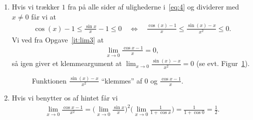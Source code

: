 \begin{enumerate}
	\item Hvis vi trækker $1$ fra på alle sider af ulighederne i~\eqref{eq:4} og dividerer med $x\neq 0$ får vi at 
	\begin{align*}
	\cos(x)-1\leq \frac{\sin x}{x}-1\leq 0\quad\Leftrightarrow \quad \frac{\cos(x)-1}{x}\leq \frac{\sin(x)-x}{x^2}\leq 0.
	\end{align*}
	 Vi ved fra Opgave~\ref{it:lim3} at 
	 \begin{align*}
	\lim_{x\to 0}\frac{\cos x-1}{x}=0,
 	\end{align*}
	så igen giver et klemmeargument at $\lim_{x\to 0}\frac{\sin(x)-x}{x^2}=0$ (se evt. Figur~\ref{fig:trig6}).
	\begin{figure}
	\centering
	\caption{Funktionen $ \frac{\sin(x)-x}{x^2} $ ``klemmes'' af $0$ og $\frac{\cos x-1}{x}$.}
	\label{fig:trig6}
	\end{figure}

	
	
	\item\label{it:lim5} Hvis vi benytter os af hintet får vi	
	\begin{align*}
	\lim_{x\to 0}\frac{\cos x-1}{x^2}=\Big(\lim_{x\to 0}\frac{\sin x}{x}\Big)^2\Big(\lim_{x\to 0}\frac{1}{1+\cos x}\Big)=\frac{1}{1+\cos 0}=\frac{1}{2}.
	\end{align*}
\end{enumerate}